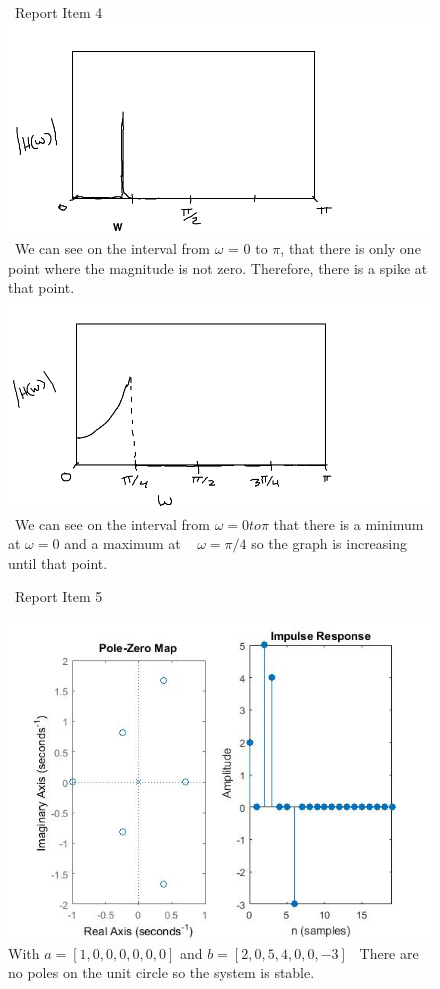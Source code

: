 \documentclass{article}
\begin{document}
\begin{figure}[H]
\ Report Item 4
\includegraphics[scale = .5]{report4_1}
\ We can see on the interval from $\omega$ = $0$ to $\pi$, that there is only one point where the magnitude is not zero. Therefore, there is a spike at that point.
\includegraphics[scale = .5]{report4_2}
\ We can see on the interval from $\omega = 0 to \pi $ that there is a minimum at $\omega = 0$ and a maximum at ~ $\omega = \pi/4$ so the graph is increasing until that point.
\end{figure}

\begin{figure}[H]
\ Report Item 5

\includegraphics[scale = .5]{report5_1}
\\ With $a = [1,0,0,0,0,0,0]$ and $b =[2,0,5,4,0,0,-3]$
\ There are no poles on the unit circle so the system is stable.
\end{figure}
\end{document}
